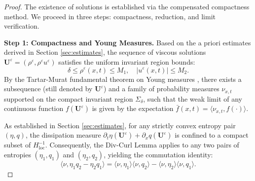 \documentclass[12pt, reqno]{article}
\theoremstyle{definition}
\numberwithin{equation}{section}
\begin{document}
\begin{proof}
The existence of solutions is established via the compensated compactness method. We proceed in three steps: compactness, reduction, and limit verification.

\textbf{Step 1: Compactness and Young Measures.}
Based on the a priori estimates derived in Section \ref{sec:estimates}, the sequence of viscous solutions $\mathbf{U}^\varepsilon = (\rho^\varepsilon, \rho^\varepsilon u^\varepsilon)$ satisfies the uniform invariant region bounds:
\[
\delta \le \rho^\varepsilon(x,t) \le M_1, \quad |u^\varepsilon(x,t)| \le M_2.
\]
By the Tartar-Murat fundamental theorem on Young measures \cite{Tartar1979}, there exists a subsequence (still denoted by $\mathbf{U}^\varepsilon$) and a family of probability measures $\nu_{x,t}$ supported on the compact invariant region $\Sigma_\delta$, such that the weak limit of any continuous function $f(\mathbf{U}^\varepsilon)$ is given by the expectation $\bar{f}(x,t) = \langle \nu_{x,t}, f(\cdot) \rangle$.

As established in Section \ref{sec:estimates}, for any strictly convex entropy pair $(\eta, q)$, the dissipation measure $\partial_t \eta(\mathbf{U}^\varepsilon) + \partial_x q(\mathbf{U}^\varepsilon)$ is confined to a compact subset of $H^{-1}_{\mathrm{loc}}$. Consequently, the Div-Curl Lemma applies to any two pairs of entropies $(\eta_1, q_1)$ and $(\eta_2, q_2)$, yielding the commutation identity:
\begin{equation} \label{eq:tartar_identity}
\langle \nu, \eta_1 q_2 - \eta_2 q_1 \rangle = \langle \nu, \eta_1 \rangle \langle \nu, q_2 \rangle - \langle \nu, \eta_2 \rangle \langle \nu, q_1 \rangle.
\end{equation}


\end{proof}
\end{document}
